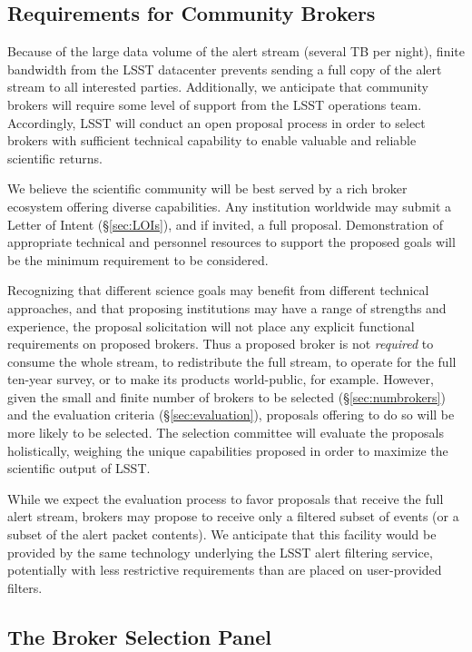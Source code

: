 \subsection{Requirements for Community Brokers}

Because of the large data volume of the alert stream (several TB per night), finite bandwidth from the LSST datacenter prevents sending a full copy of the alert stream to all interested parties.
Additionally, we anticipate that community brokers will require some level of support from the LSST operations team.
Accordingly, LSST will conduct an open proposal process in order to select brokers with sufficient technical capability to enable valuable and reliable scientific returns.

We believe the scientific community will be best served by a rich broker ecosystem offering diverse capabilities.
Any institution worldwide may submit a Letter of Intent (\S \ref{sec:LOIs}), and if invited, a full proposal.
Demonstration of appropriate technical and personnel resources to support the proposed goals will be the minimum requirement to be considered.

Recognizing that different science goals may benefit from different technical approaches, and that proposing institutions may have a range of strengths and experience, the proposal solicitation will not place any explicit functional requirements on proposed brokers.
Thus a proposed broker is not \textit{required} to consume the whole stream, to redistribute the full stream, to operate for the full ten-year survey, or to make its products world-public, for example.
However, given the small and finite number of brokers to be selected (\S \ref{sec:numbrokers}) and the evaluation criteria (\S \ref{sec:evaluation}), proposals offering to do so will be more likely to be selected.
The selection committee will evaluate the proposals holistically, weighing the unique capabilities proposed in order to maximize the scientific output of LSST.

While we expect the evaluation process to favor proposals that receive the full alert stream, brokers may propose to receive only a filtered subset of events (or a subset of the alert packet contents).
We anticipate that this facility would be provided by the same technology underlying the LSST alert filtering service, potentially with less restrictive requirements than are placed on user-provided filters.

\subsection{The Broker Selection Panel}

